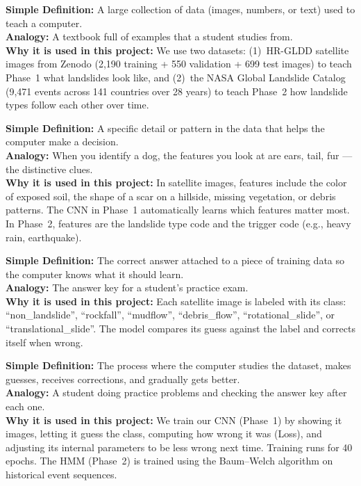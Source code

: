 \documentclass[11pt]{article}
\begin{document}
\begin{description}[style=nextline, leftmargin=1.5cm]

    \item[\textbf{Dataset}]
    \textbf{Simple Definition:} A large collection of data (images, numbers, or text) used to teach a computer.\\
    \textbf{Analogy:} A textbook full of examples that a student studies from.\\
    \textbf{Why it is used in this project:} We use two datasets: (1)~HR-GLDD satellite images from Zenodo (2,190 training + 550 validation + 699 test images) to teach Phase~1 what landslides look like, and (2)~the NASA Global Landslide Catalog (9,471 events across 141 countries over 28 years) to teach Phase~2 how landslide types follow each other over time.

    \item[\textbf{Feature}]
    \textbf{Simple Definition:} A specific detail or pattern in the data that helps the computer make a decision.\\
    \textbf{Analogy:} When you identify a dog, the features you look at are ears, tail, fur --- the distinctive clues.\\
    \textbf{Why it is used in this project:} In satellite images, features include the color of exposed soil, the shape of a scar on a hillside, missing vegetation, or debris patterns. The CNN in Phase~1 automatically learns which features matter most. In Phase~2, features are the landslide type code and the trigger code (e.g., heavy rain, earthquake).

    \item[\textbf{Label}]
    \textbf{Simple Definition:} The correct answer attached to a piece of training data so the computer knows what it should learn.\\
    \textbf{Analogy:} The answer key for a student's practice exam.\\
    \textbf{Why it is used in this project:} Each satellite image is labeled with its class: ``non\_landslide'', ``rockfall'', ``mudflow'', ``debris\_flow'', ``rotational\_slide'', or ``translational\_slide''. The model compares its guess against the label and corrects itself when wrong.

    \item[\textbf{Training}]
    \textbf{Simple Definition:} The process where the computer studies the dataset, makes guesses, receives corrections, and gradually gets better.\\
    \textbf{Analogy:} A student doing practice problems and checking the answer key after each one.\\
    \textbf{Why it is used in this project:} We train our CNN (Phase~1) by showing it images, letting it guess the class, computing how wrong it was (Loss), and adjusting its internal parameters to be less wrong next time. Training runs for 40 epochs. The HMM (Phase~2) is trained using the Baum--Welch algorithm on historical event sequences.


\end{description}
\end{document}
